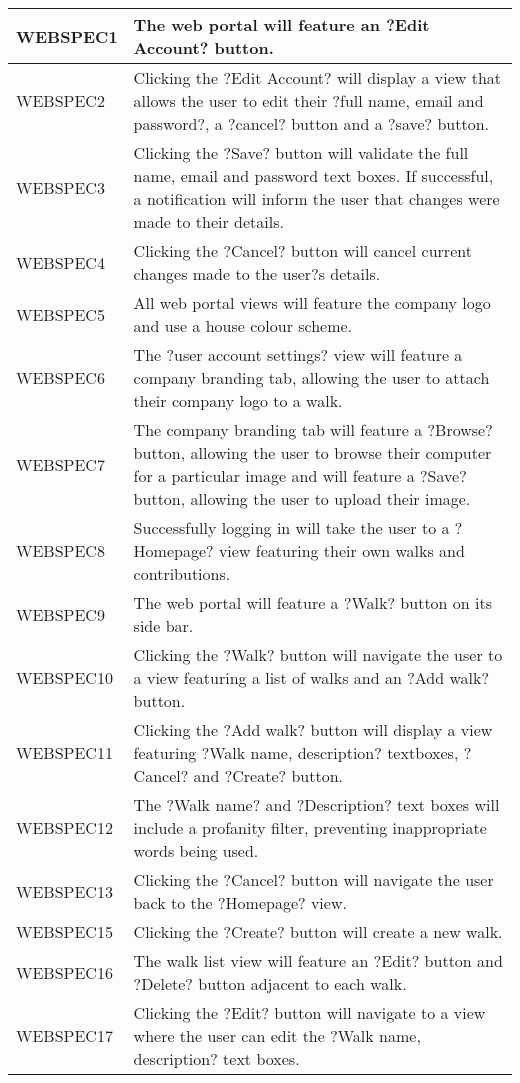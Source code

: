 \documentclass[11pt,a4paper]{article}
\begin{document}
\begin{longtable}{|p{2.5cm}p{13cm}|}
\hline
WEBSPEC1 & The web portal will feature an ?Edit Account? button. \\ \hline
WEBSPEC2 & Clicking the ?Edit Account? will display a view that allows the user to edit their ?full name, email and password?, a ?cancel? button and a ?save? button. \\ \hline
WEBSPEC3 & Clicking the ?Save? button will validate the full name, email and password text boxes. If successful, a notification will inform the user that changes were made to their details. \\ \hline
WEBSPEC4 & Clicking the ?Cancel? button will cancel current changes made to the user?s details. \\ \hline
WEBSPEC5 & All web portal views will feature the company logo and use a house colour scheme. \\ \hline
WEBSPEC6 & The ?user account settings? view will feature a company branding tab, allowing the user to attach their company logo to a walk. \\ \hline
WEBSPEC7 & The company branding tab will feature a ?Browse? button, allowing the user to browse their computer for a particular image and will feature a ?Save? button, allowing the user to upload their image. \\ \hline
WEBSPEC8 & Successfully logging in will take the user to a ?Homepage? view featuring their own walks and contributions. \\ \hline
WEBSPEC9 & The web portal will feature a ?Walk? button on its side bar. \\ \hline
WEBSPEC10 & Clicking the ?Walk? button will navigate the user to a view featuring a list of walks and an ?Add walk? button. \\ \hline
WEBSPEC11 & Clicking the ?Add walk? button will display a view featuring ?Walk name, description? textboxes, ?Cancel? and ?Create? button. \\ \hline
WEBSPEC12 & The ?Walk name? and ?Description? text boxes will include a profanity filter, preventing inappropriate words being used. \\ \hline
WEBSPEC13 & Clicking the ?Cancel? button will navigate the user back to the ?Homepage? view. \\ \hline
WEBSPEC15 & Clicking the ?Create? button will create a new walk. \\ \hline
WEBSPEC16 & The walk list view will feature an ?Edit? button and ?Delete? button adjacent to each walk. \\ \hline
WEBSPEC17 & Clicking the ?Edit? button will navigate to a view where the user can edit the ?Walk name, description? text boxes. \\ \hline

\end{longtable}
\end{document}
